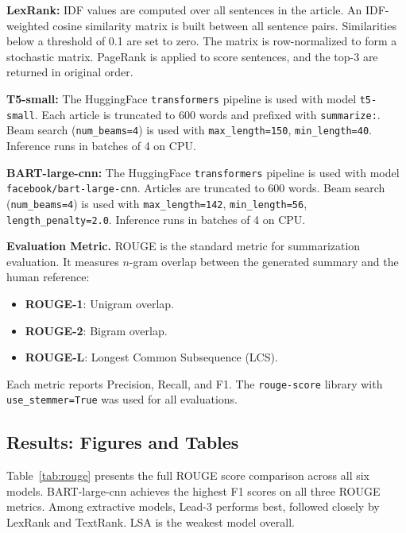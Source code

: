 \documentclass[conference]{IEEEtran}
\begin{document}
\noindent\textbf{LexRank:}
IDF values are computed over all sentences in the article. An
IDF-weighted cosine similarity matrix is built between all sentence pairs.
Similarities below a threshold of 0.1 are set to zero. The matrix is
row-normalized to form a stochastic matrix. PageRank is applied to score
sentences, and the top-3 are returned in original order.

\noindent\textbf{T5-small:}
The HuggingFace \texttt{transformers} pipeline is used with model
\texttt{t5-small}. Each article is truncated to 600 words and prefixed
with \texttt{summarize:}. Beam search (\texttt{num\_beams=4}) is used
with \texttt{max\_length=150}, \texttt{min\_length=40}. Inference runs
in batches of 4 on CPU.

\noindent\textbf{BART-large-cnn:}
The HuggingFace \texttt{transformers} pipeline is used with model
\texttt{facebook/bart-large-cnn}. Articles are truncated to 600 words.
Beam search (\texttt{num\_beams=4}) is used with \texttt{max\_length=142},
\texttt{min\_length=56}, \texttt{length\_penalty=2.0}. Inference runs in
batches of 4 on CPU.

\noindent\textbf{Evaluation Metric.}
ROUGE \cite{lin2004} is the standard metric for summarization evaluation.
It measures $n$-gram overlap between the generated summary and the human
reference:
\begin{itemize}
    \item \textbf{ROUGE-1}: Unigram overlap.
    \item \textbf{ROUGE-2}: Bigram overlap.
    \item \textbf{ROUGE-L}: Longest Common Subsequence (LCS).
\end{itemize}
Each metric reports Precision, Recall, and F1. The \texttt{rouge-score}
library with \texttt{use\_stemmer=True} was used for all evaluations.

\subsection{Results: Figures and Tables}

Table~\ref{tab:rouge} presents the full ROUGE score comparison across all
six models. BART-large-cnn achieves the highest F1 scores on all three
ROUGE metrics. Among extractive models, Lead-3 performs best, followed
closely by LexRank and TextRank. LSA is the weakest model overall.
\end{document}

